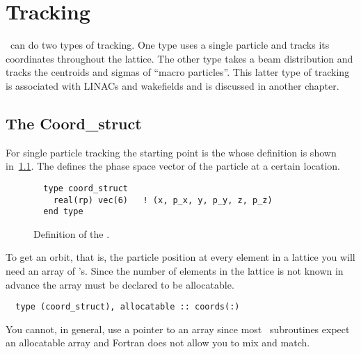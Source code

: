 \chapter{Tracking}
\label{s:tm}

\bmad\ can do two types of tracking. One type uses a single particle 
and tracks its coordinates throughout the lattice. The other type
takes a beam distribution and tracks the centroids and sigmas of
``macro particles''.  This latter type of tracking is associated with
LINACs and wakefields and is discussed in another chapter.

\section{The Coord\_struct}

For single particle tracking the starting point is the
 whose definition is shown
in~\ref{f:coord_struct}. The  defines the phase
space vector of the particle at a certain location.

\begin{figure}[h]
\centering
\small
\begin{verbatim}
  type coord_struct
    real(rp) vec(6)   ! (x, p_x, y, p_y, z, p_z)
  end type
\end{verbatim}
\caption{Definition of the .}
\label{f:coord_struct}
\end{figure}

To get an orbit, that is, the particle position at every element in a lattice
you will need an array of 's. Since
the number of elements in the lattice is not known in advance the
array must be declared to be allocatable. 
\begin{verbatim}
  type (coord_struct), allocatable :: coords(:)
\end{verbatim}
You cannot, in general, use a pointer to an array since most \bmad\
subroutines expect an allocatable array and Fortran does not allow you
to mix and match.

